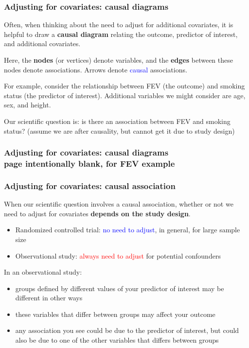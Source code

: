 \documentclass[12pt, 
hyperref={colorlinks=true, linkcolor=blue, urlcolor=cyan},dvipsnames]{beamer}
\begin{document}
\begin{frame}
\frametitle{Adjusting for covariates: causal diagrams}
Often, when thinking about the need to adjust for additional covariates, it is helpful to draw a \textbf{causal diagram} relating the outcome, predictor of interest, and additional covariates.

Here, the \textbf{nodes} (or vertices) denote variables, and the \textbf{edges} between these nodes denote associations. Arrows denote \textcolor{blue}{causal} associations.

For example, consider the relationship between FEV (the outcome) and smoking status (the predictor of interest). Additional variables we might consider are age, sex, and height. 

Our scientific question is: is there an association between FEV and smoking status? {\small (assume we are after causality, but cannot get it due to study design)}
\end{frame}

\begin{frame}
\frametitle{Adjusting for covariates: causal diagrams \\ {\small page intentionally blank, for FEV example}}


\end{frame}

\begin{frame}
\frametitle{Adjusting for covariates: causal association}

When our scientific question involves a causal association, whether or not we need to adjust for covariates \textbf{depends on the study design}. \vspace{-0.4cm}
\begin{itemize}
\item Randomized controlled trial: \textcolor{blue}{no need to adjust}, in general, for large sample size
\item Observational study: \textcolor{red}{always need to adjust} for potential confounders
\end{itemize}

In an observational study: \vspace{-0.4cm}
\begin{itemize}
\item groups defined by different values of your predictor of interest may be different in other ways
\item these variables that differ between groups may affect your outcome
\item any association you see could be due to the predictor of interest, but could also be due to one of the other variables that differs between groups
\end{itemize}
\end{frame}
\end{document}

